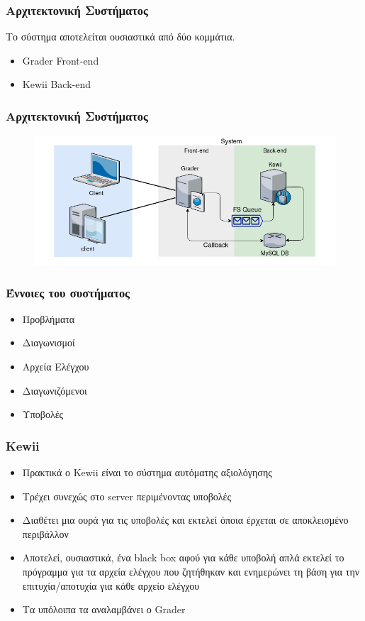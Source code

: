 \documentclass{beamer}
\begin{document}
\begin{frame}
  \frametitle{Αρχιτεκτονική Συστήματος}

  Το σύστημα αποτελείται ουσιαστικά από δύο κομμάτια.

  \begin{itemize}
      \item Grader Front-end
      \item Kewii Back-end
  \end{itemize}

\end{frame}

\begin{frame}
  \frametitle{Αρχιτεκτονική Συστήματος}

  \begin{figure}
    \includegraphics[scale=0.45]{../Figures/graderarchitecture.png}
  \end{figure}
\end{frame}

\begin{frame}
  \frametitle{Έννοιες του συστήματος}

  \begin{itemize}
      \item Προβλήματα
      \item Διαγωνισμοί
      \item Αρχεία Ελέγχου
      \item Διαγωνιζόμενοι
      \item Υποβολές
  \end{itemize}

\end{frame}

\begin{frame}
  \frametitle{Kewii}

  \begin{itemize}
      \item Πρακτικά ο Kewii είναι το σύστημα αυτόματης αξιολόγησης
      \item Τρέχει συνεχώς στο server περιμένοντας υποβολές
      \item Διαθέτει μια ουρά για τις υποβολές και εκτελεί όποια έρχεται σε
        αποκλεισμένο περιβάλλον
      \item Αποτελεί, ουσιαστικά, ένα black box αφού για κάθε υποβολή απλά εκτελεί
        το πρόγραμμα για τα αρχεία ελέγχου που ζητήθηκαν και ενημερώνει τη βάση για
        την επιτυχία/αποτυχία για κάθε αρχείο ελέγχου
      \item Τα υπόλοιπα τα αναλαμβάνει ο Grader
  \end{itemize}
\end{frame}
\end{document}
